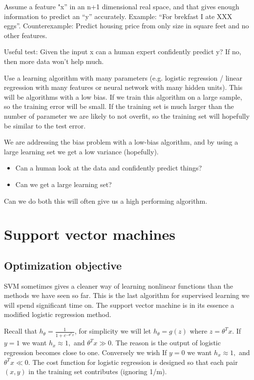 \documentclass[a4, 12pt, english, USenglish]{scrreprt}
\begin{document}
Assume a feature "x'' in an n+1 dimensional real space, and that gives
enough information to predict an ``y'' accurately.  Example: ``For
brekfast I ate XXX eggs''.  Counterexample: Predict housing price from
only size in square feet and no other features.

Useful test: Given the input x can a human expert confidently predict
y?  If no, then more data won't help much.

Use a learning algorithm with many parameters (e.g. logistic
regression / linear regression with many features or neural network
with many hidden units).  This will be  algorithms with a low bias.
If we train this algorithm on a large sample, so the training error
will be small.   If the training set is much larger than the number of
parameter we are likely to not overfit, so the training set will
hopefully be similar to the test error.   

We are addressing the bias problem with a low-bias algorithm, and by
using a large learning set we get a low variance (hopefully).

\begin{itemize}
\item Can a human look at the data and confidently predict things?
\item Can we get a large learning set?
\end{itemize}

Can we do both this will often give us a high performing algorithm.

\chapter{Support vector machines}

\section{Optimization objective}

SVM sometimes gives  a cleaner way of learning nonlinear functions
than the methods we have seen so far.  This is the last algorithm for
supervised learning we will spend significant time on.  The support
vector machine is in its essence a modified logistic regression
method.  

Recall that \( h_\theta = \frac{1}{1 + e^{-\theta^T x}} \), for
simplicity we will let \(h_\theta = g(z)\) where \(z = \theta^T x\).
If \(y=1\) we want  \(h_x \approx 1,\) and \(\theta^T x \gg 0\).  The
reason is the output of logistic regression becomes close to one.
Conversely we wish If \(y=0\) we want  \(h_x \approx 1,\) and
\(\theta^T x \ll 0\).   The cost function for logistic regression is
designed so that each pair \((x,y)\) in the training set contributes
(ignoring 1/m).
\end{document}
